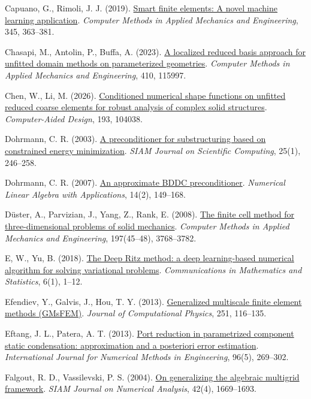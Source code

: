 \documentclass[preprint,12pt,authoryear]{elsarticle}
\begin{document}
Capuano, G., Rimoli, J. J. (2019). \href{https://doi.org/10.1016/j.cma.2018.10.046}{Smart finite elements: A novel machine learning application}. \emph{Computer Methods in Applied Mechanics and Engineering}, 345, 363--381.

Chasapi, M., Antolin, P., Buffa, A. (2023). \href{https://doi.org/10.1016/j.cma.2023.115997}{A localized reduced basis approach for unfitted domain methods on parameterized geometries}. \emph{Computer Methods in Applied Mechanics and Engineering}, 410, 115997.

Chen, W., Li, M. (2026). \href{https://doi.org/10.1016/j.cad.2026.104038}{Conditioned numerical shape functions on unfitted reduced coarse elements for robust analysis of complex solid structures}. \emph{Computer-Aided Design}, 193, 104038.

Dohrmann, C. R. (2003). \href{https://doi.org/10.1137/S1064827502412887}{A preconditioner for substructuring based on constrained energy minimization}. \emph{SIAM Journal on Scientific Computing}, 25(1), 246--258.

Dohrmann, C. R. (2007). \href{https://doi.org/10.1002/nla.514}{An approximate BDDC preconditioner}. \emph{Numerical Linear Algebra with Applications}, 14(2), 149--168.

Düster, A., Parvizian, J., Yang, Z., Rank, E. (2008). \href{https://doi.org/10.1016/j.cma.2008.02.036}{The finite cell method for three-dimensional problems of solid mechanics}. \emph{Computer Methods in Applied Mechanics and Engineering}, 197(45--48), 3768--3782.

E, W., Yu, B. (2018). \href{https://doi.org/10.1007/s40304-018-0127-z}{The Deep Ritz method: a deep learning-based numerical algorithm for solving variational problems}. \emph{Communications in Mathematics and Statistics}, 6(1), 1--12.

Efendiev, Y., Galvis, J., Hou, T. Y. (2013). \href{https://doi.org/10.1016/j.jcp.2013.04.045}{Generalized multiscale finite element methods (GMsFEM)}. \emph{Journal of Computational Physics}, 251, 116--135.

Eftang, J. L., Patera, A. T. (2013). \href{https://doi.org/10.1002/nme.4543}{Port reduction in parametrized component static condensation: approximation and a posteriori error estimation}. \emph{International Journal for Numerical Methods in Engineering}, 96(5), 269--302.

Falgout, R. D., Vassilevski, P. S. (2004). \href{https://doi.org/10.1137/S0036142903429742}{On generalizing the algebraic multigrid framework}. \emph{SIAM Journal on Numerical Analysis}, 42(4), 1669--1693.
\end{document}

